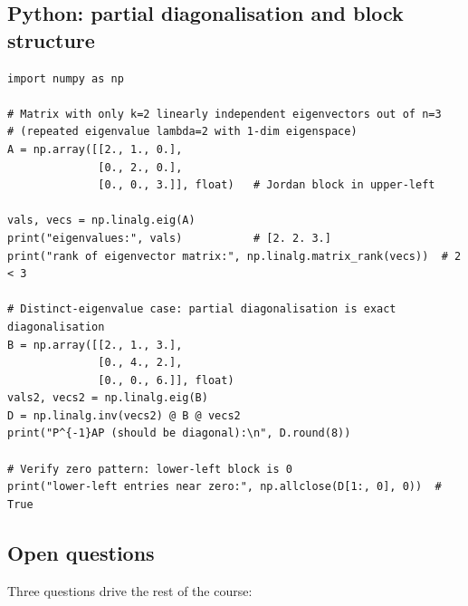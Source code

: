 \documentclass[11pt]{article}
\theoremstyle{definition}
\theoremstyle{plain}
\begin{document}
\subsection{Python: partial diagonalisation and block structure}
\begin{lstlisting}
import numpy as np

# Matrix with only k=2 linearly independent eigenvectors out of n=3
# (repeated eigenvalue lambda=2 with 1-dim eigenspace)
A = np.array([[2., 1., 0.],
              [0., 2., 0.],
              [0., 0., 3.]], float)   # Jordan block in upper-left

vals, vecs = np.linalg.eig(A)
print("eigenvalues:", vals)           # [2. 2. 3.]
print("rank of eigenvector matrix:", np.linalg.matrix_rank(vecs))  # 2 < 3

# Distinct-eigenvalue case: partial diagonalisation is exact diagonalisation
B = np.array([[2., 1., 3.],
              [0., 4., 2.],
              [0., 0., 6.]], float)
vals2, vecs2 = np.linalg.eig(B)
D = np.linalg.inv(vecs2) @ B @ vecs2
print("P^{-1}AP (should be diagonal):\n", D.round(8))

# Verify zero pattern: lower-left block is 0
print("lower-left entries near zero:", np.allclose(D[1:, 0], 0))  # True
\end{lstlisting}

\subsection{Open questions}

Three questions drive the rest of the course:
\end{document}

